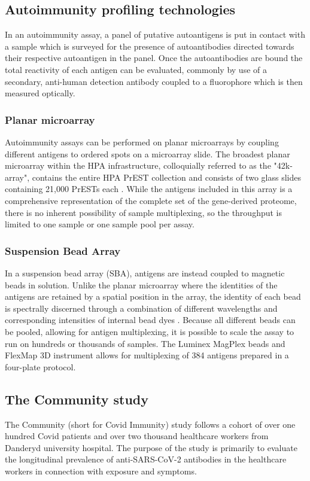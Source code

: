 \documentclass{article}
\begin{document}
\subsection{Autoimmunity profiling technologies}
In an autoimmunity assay, a panel of putative autoantigens is put in contact with a sample which is surveyed for the presence of autoantibodies directed towards their respective autoantigen in the panel. Once the autoantibodies are bound the total reactivity of each antigen can be evaluated, commonly by use of a secondary, anti-human detection antibody coupled to a fluorophore which is then measured optically.

\subsubsection{Planar microarray}
Autoimmunity assays can be performed on planar microarrays by coupling different antigens to ordered spots on a microarray slide. The broadest planar microarray within the HPA infrastructure, colloquially referred to as the "42k-array", contains the entire HPA PrEST collection and consists of two glass slides containing 21,000 PrESTs each \cite{42k}. While the antigens included in this array is a comprehensive representation of the complete set of the gene-derived proteome, there is no inherent possibility of sample multiplexing, so the throughput is limited to one sample or one sample pool per assay.

\subsubsection{Suspension Bead Array}
In a suspension bead array (SBA), antigens are instead coupled to magnetic beads in solution. Unlike the planar microarray where the identities of the antigens are retained by a spatial position in the array, the identity of each bead is spectrally discerned through a combination of different wavelengths and corresponding intensities of internal bead dyes \cite{xmap}. Because all different beads can be pooled, allowing for antigen multiplexing, it is possible to scale the assay to run on hundreds or thousands of samples. The Luminex MagPlex beads and FlexMap 3D instrument allows for multiplexing of 384 antigens prepared in a four-plate protocol.

\subsection{The Community study}
The Community (short for Covid Immunity) study \cite{community, fas2} follows a cohort of over one hundred Covid patients and over two thousand healthcare workers from Danderyd university hospital. The purpose of the study is primarily to evaluate the longitudinal prevalence of anti-SARS-CoV-2 antibodies in the healthcare workers in connection with exposure and symptoms.
\end{document}
